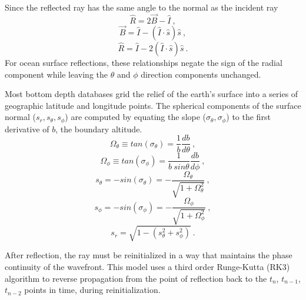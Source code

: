 \documentclass{ws-jca}
\begin{document}
Since the reflected ray has the same angle to the normal as the incident ray
\begin{equation}
\hat{R} = 2\vec{B} - \hat{I} \:,
\label{eq:reflect_r_hat}
\end{equation}
\begin{equation}
\vec{B} =  \hat{I} - ( \hat{I} \cdot \hat{s} ) \hat{s} \:,
\label{eq:reflect_p_hat}
\end{equation}
\begin{equation}
\hat{R} =  \hat{I} - 2 ( \hat{I} \cdot \hat{s} ) \hat{s} \:.
\label{eq:reflect_direction}
\end{equation}
For ocean surface reflections, these relationships negate the sign of the
radial component while leaving the \(\theta\) and \(\phi\) direction
components unchanged.

Most bottom depth databases grid the relief of the earth's surface into a
series of geographic latitude and longitude points. The spherical components of the
surface normal (\( s_r, s_\theta, s_\phi\)) are computed by equating the
slope (\(\sigma_\theta, \sigma_\phi\)) to the first derivative of $b$, the
boundary altitude.
\begin{equation}
	\Omega_\theta \equiv tan(\sigma_\theta) 
		= \frac{1}{b} \frac{db}{d\theta} \:,
	\label{eq:slope_theta}
\end{equation}
\begin{equation}
	\Omega_\phi \equiv tan(\sigma_\phi) 
		= \frac{1}{b \: sin\theta} \frac{db}{d\phi} \:,
	\label{eq:slope_phi}
\end{equation}
\begin{equation}
	s_\theta = - sin(\sigma_\theta) 
		= -\frac{\Omega_\theta}{ \sqrt{1+\Omega^2_\theta} } \:,
	\label{eq:normal_theta}
\end{equation}
\begin{equation}
	s_\phi = - sin(\sigma_\phi) 
		= -\frac{\Omega_\phi}{ \sqrt{1+\Omega^2_\phi} } \:,
	\label{eq:normal_phi}
\end{equation}
\begin{equation}
	s_r = \sqrt{ 1- ( s^2_\theta + s^2_\phi )} \:.
	\label{eq:normal_r}
\end{equation}

After reflection, the ray must be reinitialized in a way that maintains the
phase continuity of the wavefront. This model uses a third order
Runge-Kutta (RK3) algorithm to reverse propagation from the point of
reflection back to the \(t_n\), \(t_{n-1}\), \(t_{n-2}\) points in time, during reinitialization.
\end{document}
